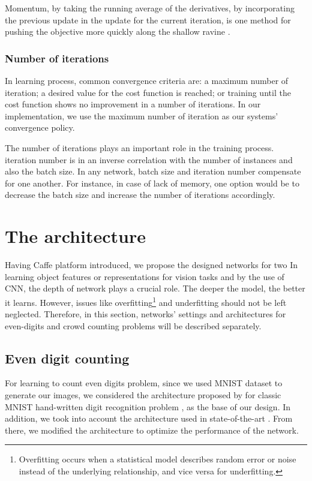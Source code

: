 Momentum, by taking the running average of the derivatives, by incorporating the previous update in the update for the current iteration, is one method for pushing the objective more quickly along the shallow ravine \cite{sgd}. 

\subsubsection{Number of iterations}

In learning process, common convergence criteria are: a maximum number of iteration; a desired value for the cost function is reached; or training until the cost function shows no improvement in a number of iterations. In our implementation, we use the maximum number of iteration as our systems' convergence policy. 
 
The number of iterations plays an important role in the training process. iteration number is in an inverse correlation with the number of instances and also the batch size. In any network, batch size and iteration number compensate for one another. For instance, in case of lack of memory, one option would be to decrease the batch size and increase the number of iterations accordingly.


\section{The architecture}
\label{imparch}

Having Caffe platform introduced, we propose the designed networks for two 
In learning object features or representations for vision tasks and by the use of CNN, the depth of network plays a crucial role. The deeper the model, the better it learns. However, issues like overfitting\footnote{Overfitting occurs when a statistical model describes random error or noise instead of the underlying relationship, and vice versa for underfitting. } and underfitting should not be left neglected.   
Therefore, in this section, networks' settings and architectures for even-digits and crowd counting problems will be described separately. 

\subsection{Even digit counting}
\label{subsubsec:digitarch}

For learning to count even digits problem, since we used MNIST dataset to generate our images, we considered the architecture proposed by \citeauthor{lecun1995comparison} for classic MNIST hand-written digit recognition problem \cite{lecun1995comparison}, as the base of our design. In addition, we took into account the architecture used in state-of-the-art \cite{segui2015learning}. From there, we modified the architecture to optimize the performance of the network. 
 

